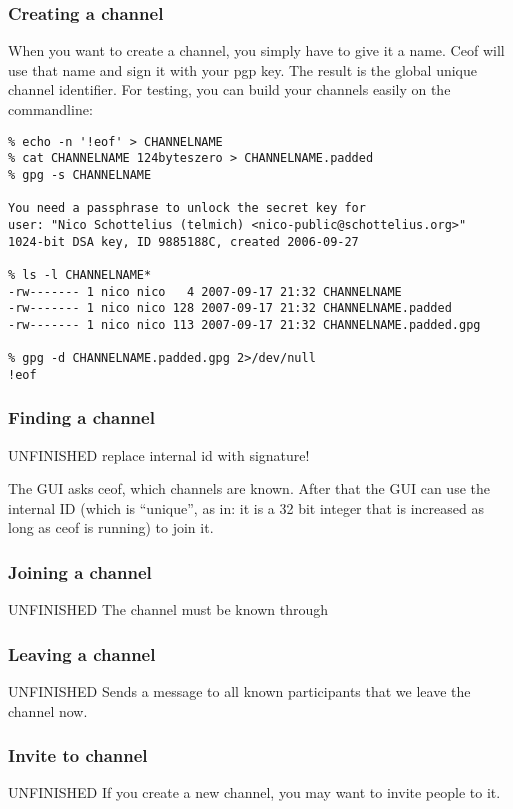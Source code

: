 \documentclass[12pt,a4paper]{article}
\begin{document}
\subsubsection{Creating a channel}
When you want to create a channel, you simply have to give it a name.
Ceof will use that name and sign it with your pgp key. The result is the
global unique channel identifier. For testing, you can build your channels
easily on the commandline:
\begin{verbatim}
% echo -n '!eof' > CHANNELNAME
% cat CHANNELNAME 124byteszero > CHANNELNAME.padded
% gpg -s CHANNELNAME 

You need a passphrase to unlock the secret key for
user: "Nico Schottelius (telmich) <nico-public@schottelius.org>"
1024-bit DSA key, ID 9885188C, created 2006-09-27

% ls -l CHANNELNAME*
-rw------- 1 nico nico   4 2007-09-17 21:32 CHANNELNAME
-rw------- 1 nico nico 128 2007-09-17 21:32 CHANNELNAME.padded
-rw------- 1 nico nico 113 2007-09-17 21:32 CHANNELNAME.padded.gpg

% gpg -d CHANNELNAME.padded.gpg 2>/dev/null
!eof
\end{verbatim}
\subsubsection{Finding a channel}
UNFINISHED
replace internal id with signature!

The GUI asks ceof, which channels are known. After that the GUI
can use the internal ID (which is "`unique"', as in: it is a 32 bit integer
that is increased as long as ceof is running) to join it.
\subsubsection{Joining a channel}
UNFINISHED
The channel must be known through 
\subsubsection{Leaving a channel}
UNFINISHED
Sends a message to all known participants that we leave the channel now.
\subsubsection{Invite to channel}
UNFINISHED
If you create a new channel, you may want to invite people to it.
\end{document}
